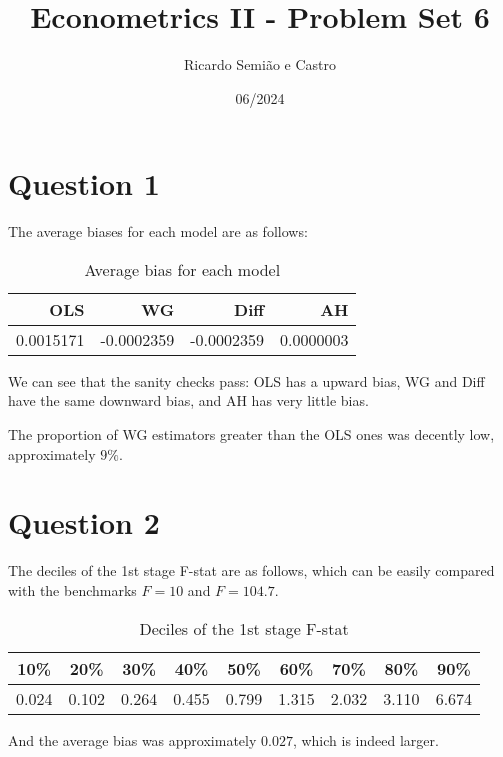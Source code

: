 \documentclass[12pt]{article}
\title{Econometrics II - Problem Set 6}
\author{Ricardo Semião e Castro}
\date{06/2024}
\begin{document}
\maketitle

\section*{Question 1}

The average biases for each model are as follows:

\begin{table}[H]
    \centering
    \caption{Average bias for each model}
    \label{tb:bias}
    \begin{tabular}{rrrr}
        \hline
        OLS       & WG      & Diff      & AH        \\ \hline
        0.0015171 & -0.0002359 & -0.0002359 & 0.0000003 \\
        \hline
    \end{tabular}
\end{table}

We can see that the sanity checks pass: OLS has a upward bias, WG and Diff have the same downward bias, and AH has very little bias.

The proportion of WG estimators greater than the OLS ones was decently low, approximately $9\%$.



\section*{Question 2}

The deciles of the 1st stage F-stat are as follows, which can be easily compared with the benchmarks $F = 10$ and $F = 104.7$.

\begin{table}[H]
    \centering
    \caption{Deciles of the 1st stage F-stat}
    \label{tb:deciles}
    \begin{tabular}{ccccccccc}
        \hline
        10\% & 20\% & 30\% & 40\% & 50\% & 60\% & 70\% & 80\% & 90\% \\ \hline
        0.024 & 0.102 & 0.264 & 0.455 & 0.799 & 1.315 & 2.032 & 3.110 & 6.674 \\
        \hline
    \end{tabular}
\end{table}

And the average bias was approximately $0.027$, which is indeed larger.
\end{document}
